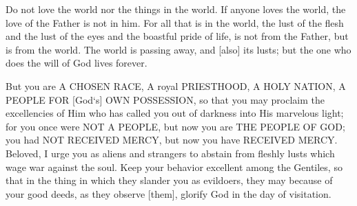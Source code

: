 \vspace{4\baselineskip}


\begin{scripture}[1 John 2:15-17]
    Do not love the world nor the things in the world. If anyone loves the world, the love of the Father is not in him.
    For all that is in the world, the lust of the flesh and the lust of the eyes and the boastful pride of life, is not from the Father, but is from the world.
    The world is passing away, and [also] its lusts; but the one who does the will of God lives forever.
\end{scripture}

\vspace{2\baselineskip}

\begin{scripture}[1 Peter 2:9-12]
    But you are A CHOSEN RACE, 
     A royal PRIESTHOOD, A HOLY NATION, A PEOPLE FOR [God`s] OWN POSSESSION, so that you may proclaim the excellencies of Him who has called you out of darkness into His marvelous light;
    for you once were NOT A PEOPLE, but now you are THE PEOPLE OF GOD; you had NOT RECEIVED MERCY, but now you have RECEIVED MERCY.
    Beloved, I urge you as aliens and strangers to abstain from fleshly lusts which wage war against the soul.
    Keep your behavior excellent among the Gentiles, so that in the thing in which they slander you as evildoers, they may because of your good deeds, as they observe [them], glorify God in the day of visitation.
\end{scripture}

\vspace{2\baselineskip}
